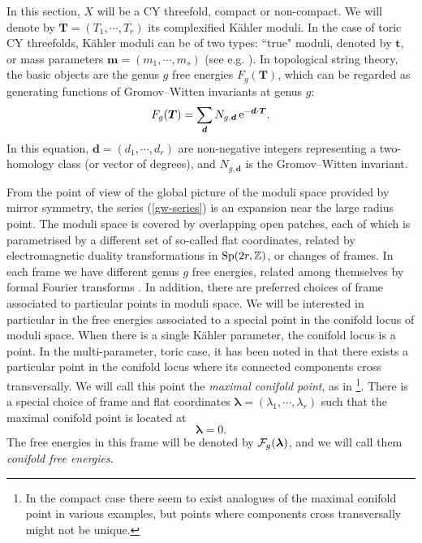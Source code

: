 \documentclass[a4paper,11pt]{article}
\theoremstyle{definition}
\newcommand{\CF}{{\cal F}}
\def\IZ{{\mathbb Z}}
\newcommand{\re}{{\rm e}}
\def\bd{\boldsymbol{d}}
\def\bm{\boldsymbol{m}}
\def\bt{\boldsymbol{t}}
\def\bT{\boldsymbol{T}}
\def\blambda{\boldsymbol{\lambda}}
\newcommand{\be}{\begin{equation}}
\newcommand{\ee}{\end{equation}}
\begin{document}
In this section, $X$ will be a CY threefold, compact or non-compact. 
We will denote by $\boldsymbol{T}=(T_1, \cdots, T_r)$ its complexified K\"ahler moduli. In the case of toric CY threefolds, K\"ahler moduli can be of two types: ``true" moduli, denoted by $\bt$, or mass parameters $\bm=(m_1, \cdots, m_s)$ (see e.g. \cite{hkp}). In topological string theory, the basic 
objects are the genus $g$ free energies $F_g (\bT)$, which can be regarded as generating functions of 
Gromov--Witten invariants at genus $g$:
%
\be
\label{gw-series}
F_g(\bT)= \sum_{\bd} N_{g, \bd}\, \re^{-\bd \cdot \bT}. 
\ee
%
In this equation, $\bd=(d_1, \cdots, d_r)$ are non-negative integers representing a two-homology class (or vector of degrees), and 
$N_{g, \bd}$ is the Gromov--Witten invariant. 

From the point of view of the global picture of the moduli space provided by mirror symmetry, 
the series (\ref{gw-series}) is an expansion near the large radius
point.
%
The moduli space is covered by overlapping open patches, each of which
is parametrised by a different set of so-called flat coordinates,
related by electromagnetic duality transformations in
${\rm Sp}(2r, \IZ)$, or changes of frames.
%
In each frame we have different genus $g$ free energies, related among themselves by formal Fourier transforms \cite{abk}. 
In addition, there are preferred choices of frame associated 
to particular points in moduli space. We will be interested in particular in the free energies associated to a special point 
in the conifold locus of moduli space. When there is a single 
K\"ahler parameter, the conifold locus is a point. In the multi-parameter, toric case, 
it has been noted in \cite{cgm} that there exists a particular point in the conifold locus 
where its connected components cross transversally. We will call this point the {\it maximal conifold point}, 
as in \cite{cgm, cgum}\footnote{In the compact case there seem to exist analogues of the maximal 
conifold point in various examples, but points where components cross transversally might not be unique.}. There is a special 
choice of frame and flat coordinates $\blambda=(\lambda_1, \cdots, \lambda_r)$ such that the maximal conifold point is located at
%
\be
\blambda=0. 
\ee
%
The free energies in this frame will be denoted by $\CF_g(\blambda)$, and we will call them {\it conifold free energies}. 
\end{document}
